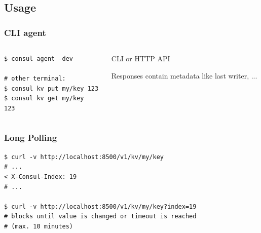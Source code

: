 \subsection{Usage}

\begin{frame}[fragile]
	\frametitle{CLI agent}

	\begin{columns}[t]
		\begin{column}{0.45\textwidth}
			\begin{verbatim}
$ consul agent -dev

# other terminal:
$ consul kv put my/key 123
$ consul kv get my/key
123
			\end{verbatim}
		\end{column}
		\begin{column}{0.55\textwidth}
			CLI or HTTP API

			Responses contain metadata like last writer, ...
		\end{column}
	\end{columns}
\end{frame}

\begin{frame}[fragile]
	\frametitle{Long Polling}
	\begin{verbatim}
$ curl -v http://localhost:8500/v1/kv/my/key
# ...
< X-Consul-Index: 19
# ...

$ curl -v http://localhost:8500/v1/kv/my/key?index=19
# blocks until value is changed or timeout is reached
# (max. 10 minutes)
	\end{verbatim}
\end{frame}
